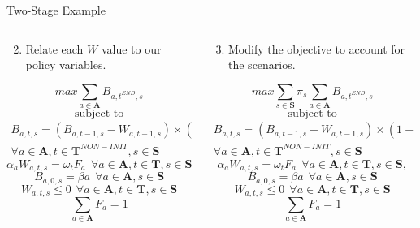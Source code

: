 \documentclass[10pt, aspectratio=169]{beamer}
\begin{document}
\begin{frame}{Two-Stage Example}
    \begin{columns}
        \begin{column}{0.5\textwidth}
            \begin{enumerate}
                \setcounter{enumi}{1}
                \item Relate each $W$ value to our policy variables.
            \end{enumerate}
            $$max \sum_{a \in \textbf{A}} B_{a,t^{END},s}$$
            $$----\text{ subject to }----$$
            \begin{equation}
                \begin{split}
                B_{a,t,s} = \left(B_{a,t-1,s}-W_{a,t-1,s}\right) \times (1 + \delta_{a,s}) \\ \forall a \in \textbf{A}, t \in \textbf{T}^{NON-INIT}, s \in \textbf{S}
                \end{split} \tag*{}
            \end{equation}
            $$\alpha_a W_{a,t,s} = \omega_t F_a \ \ \forall a \in \textbf{A}, t \in \textbf{T}, s \in \textbf{S}, $$
            $$B_{a,0,s} = \beta{a} \ \ \forall a \in \textbf{A}, s \in \textbf{S}$$
            $$W_{a,t,s} \leq 0 \ \ \forall a \in \textbf{A}, t \in \textbf{T}, s \in \textbf{S}$$
            $$\sum_{a \in \textbf{A}} F_a = 1$$
        \end{column}
        \begin{column}{0.5\textwidth}
            \begin{enumerate}
                \setcounter{enumi}{2}
                \item Modify the objective to account for the scenarios.
            \end{enumerate}
            $$max \sum_{s \in \textbf{S}} \pi_s \sum_{a \in \textbf{A}} B_{a,t^{END},s}$$
            $$----\text{ subject to }----$$
            \begin{equation}
                \begin{split}
                B_{a,t,s} = \left(B_{a,t-1,s}-W_{a,t-1,s}\right) \times (1 + \delta_{a,s}) \\ \forall a \in \textbf{A}, t \in \textbf{T}^{NON-INIT}, s \in \textbf{S}
                \end{split} \tag*{}
            \end{equation}
            $$\alpha_a W_{a,t,s} = \omega_t F_a \ \ \forall a \in \textbf{A}, t \in \textbf{T}, s \in \textbf{S}, $$
            $$B_{a,0,s} = \beta{a} \ \ \forall a \in \textbf{A}, s \in \textbf{S}$$
            $$W_{a,t,s} \leq 0 \ \ \forall a \in \textbf{A}, t \in \textbf{T}, s \in \textbf{S}$$
            $$\sum_{a \in \textbf{A}} F_a = 1$$
        \end{column}
    \end{columns}
\end{frame}
\end{document}
